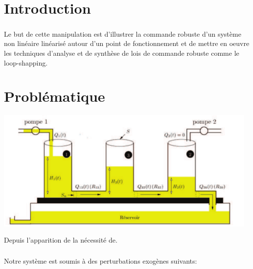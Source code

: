 \documentclass[12pt, a4paper, openany]{report}
\begin{document}
\tableofcontents
\listoffigures
\listoftables



\chapter*{Introduction}
 
 \paragraph{}
  Le but de cette manipulation est d'illustrer la commande robuste d'un système non linéaire linéarisé autour d'un point de fonctionnement et de mettre en oeuvre les techniques d'analyse et de synthèse de lois de commande robuste comme le loop-shapping.\\
                                                      



\chapter*{Problématique}
 
 \begin{center}
   \includegraphics[width=13cm]{rebout.png}
   \label{fig1}
 \end{center}   

   
Depuis l’apparition de la nécessité de. \\

\paragraph{}   
Notre système est soumis à des perturbations exogènes suivants:
        
\end{document}
